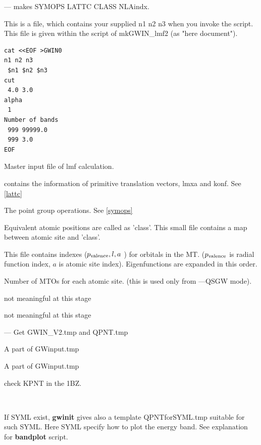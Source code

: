 {%
 \noindent --- makes SYMOPS LATTC CLASS NLAindx.

\label{lmfgw}
\infiles

 This is a file,
which contains your supplied n1 n2 n3 when you invoke the script.
This file is given within the script of mkGWIN\_lmf2 (as "here document").
{\baselineskip=2.8mm
\begin{verbatim}
cat <<EOF >GWIN0
n1 n2 n3
 $n1 $n2 $n3
cut
 4.0 3.0
alpha
 1
Number of bands
 999 99999.0 
 999 3.0 
EOF
\end{verbatim}
}
 Master input file of lmf calculation. 

\outfiles

contains the information of primitive translation vectors, lmxa and konf.
See \ref{lattc}

 The point group operations. See \ref{symops}

 Equivalent atomic positions are called as 'class'.
This small file contains a map between atomic site and 'class'.

This file contains indexes 
($p_{\rm valence}, l, a$ ) for orbitals in the MT.
($p_{\rm valence}$ is radial function index, 
$a$ is atomic site index). Eigenfunctions are expanded in this order.
}

Number of MTOs for each atomic site.
(this is used only from ---QSGW mode).


not meaningful at this stage

not meaningful at this stage

 --- Get GWIN\_V2.tmp and QPNT.tmp

\infiles





\outfiles

  A part of GWinput.tmp

  A part of GWinput.tmp

  check KPNT in the 1BZ.

\ 

If {\sf SYML} exist, {\bf gwinit} gives also
a template {\sf QPNTforSYML.tmp} 
suitable for such {\sf SYML}. 
Here {\sf SYML} specify how to plot the energy band.
See explanation for {\bf bandplot} script.

